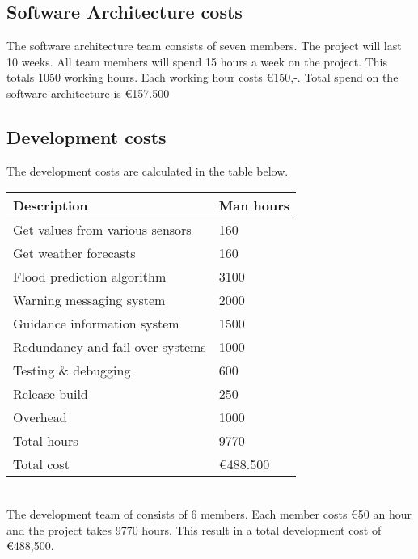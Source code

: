 \subsection{Software Architecture costs}
The software architecture team consists of seven members. The project will last 10 weeks. All team members will spend 15 hours a week on the project. This totals 1050 working hours. Each working hour costs \euro{}150,-. Total spend on the software architecture is \euro{}157.500

\subsection{Development costs}
The development costs are calculated in the table below.\\
\newline
\begin{tabular}{|L{}|L{}|}
	\toprule
	\textbf{Description} & \textbf{Man hours} \\ \midrule
	Get values from various sensors & 160 \\ \midrule
	Get weather forecasts & 160 \\ \midrule
	Flood prediction algorithm & 3100 \\ \midrule
	Warning messaging system  & 2000 \\ \midrule
	Guidance information system & 1500 \\ \midrule
	Redundancy and fail over systems & 1000 \\ \midrule
	Testing \& debugging & 600 \\ \midrule
	Release build & 250 \\ \midrule
	Overhead & 1000 \\ \midrule
	Total hours & 9770 \\ \midrule
	Total cost & \euro{}488.500 \\ \bottomrule
\end{tabular}\\
\newline
The development team of \CompanyName consists of 6 members. Each member costs  \euro{}{}50 an hour and the project takes 9770 hours. This result in a total development cost of \euro{}{}488,500.

